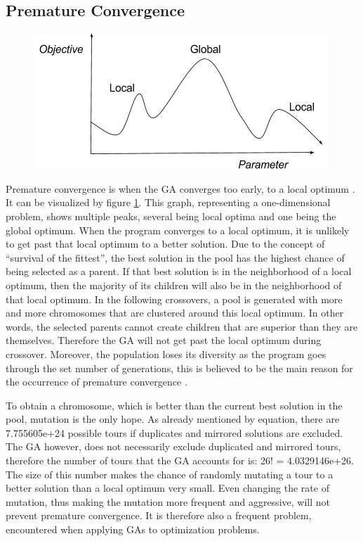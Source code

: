 \newpage
\subsection{Premature Convergence} \label{premc}

\par

\begin{figure}
			\includegraphics[trim = {0 0 5mm 0}, clip, scale = 0.5]{PrematureConvergence}
	\label{PrematureConvergence}
\end{figure}

Premature convergence is when the GA converges too early, to a local optimum \cite{Slides}.
It can be visualized by figure \ref{PrematureConvergence}. This graph, representing a one-dimensional problem, shows multiple peaks, several being local optima and one being the global optimum. When the program converges to a local optimum, it is unlikely to get past that local optimum to a better solution. Due to the concept of “survival of the fittest”, the best solution in the pool has the highest chance of being selected as a parent. If that best solution is in the neighborhood of a local optimum, then the majority of its children will also be in the neighborhood of that local optimum. In the following crossovers, a pool is generated with more and more chromosomes that are clustered around this local optimum. In other words, the selected parents cannot create children that are superior than they are themselves. Therefore the GA will not get past the local optimum during crossover. Moreover, the population loses its diversity as the program goes through the set number of generations, this is believed to be the main reason for the occurrence of premature convergence \cite{Premconvergence}\cite{Popdiv}\cite{Congress}.

\par
To obtain a chromosome, which is better than the current best solution in the pool, mutation is the only hope. As already mentioned by equation, there are 7.755605e+24 possible tours if duplicates and mirrored solutions are excluded. The GA however, does not necessarily exclude duplicated and mirrored tours, therefore the number of tours that the GA accounts for is: 26! = 4.0329146e+26. The size of this number makes the chance of randomly mutating a tour to a better solution than a local optimum very small. Even changing the rate of mutation, thus making the mutation more frequent and aggressive, will not prevent premature convergence. It is therefore also a frequent problem, encountered when applying GAs to optimization problems. 

